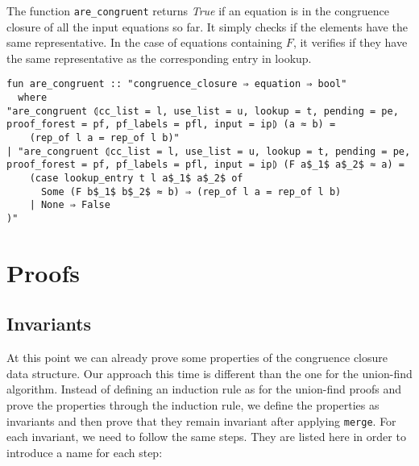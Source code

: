 \clearpage



The function \lstinline{are_congruent} returns \emph{True} if an equation is in the congruence closure of all the input equations so far. It simply checks if the elements have the same representative. In the case of equations containing $F$, it verifies if they have the same representative as the corresponding entry in lookup.

\begin{lstlisting}
fun are_congruent :: "congruence_closure ⇒ equation ⇒ bool"
  where
"are_congruent ⦇cc_list = l, use_list = u, lookup = t, pending = pe, proof_forest = pf, pf_labels = pfl, input = ip⦈ (a ≈ b) =
    (rep_of l a = rep_of l b)"
| "are_congruent ⦇cc_list = l, use_list = u, lookup = t, pending = pe, proof_forest = pf, pf_labels = pfl, input = ip⦈ (F a$_1$ a$_2$ ≈ a) =
    (case lookup_entry t l a$_1$ a$_2$ of
      Some (F b$_1$ b$_2$ ≈ b) ⇒ (rep_of l a = rep_of l b)
    | None ⇒ False
)"
\end{lstlisting}

\section{Proofs}

\subsection{Invariants}

At this point we can already prove some properties of the congruence closure data structure. Our approach this time is different than the one for the union-find algorithm. Instead of defining an induction rule as for the union-find proofs and prove the properties through the induction rule, we define the properties as invariants and then prove that they remain invariant after applying \lstinline|merge|. For each invariant, we need to follow the same steps. They are listed here in order to introduce a name for each step:

